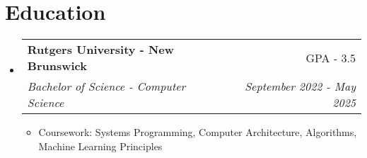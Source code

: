 \documentclass[letterpaper,10pt]{article}
\makeatletter
\newcommand{\resumeItem}[1]{
  \item\small{
    {#1 \vspace{-2pt}}
  }
}
\newcommand{\resumeSubheading}[4]{
  \vspace{-2pt}\item
    \begin{tabular*}{0.97\textwidth}[t]{l@{\extracolsep{\fill}}r}
      \textbf{#1} & #2 \\
      \textit{\small#3} & \textit{\small #4} \\
    \end{tabular*}\vspace{-7pt}
}
\newcommand{\resumeSubHeadingListStart}{\begin{itemize}[leftmargin=0.15in, label={}]}
\newcommand{\resumeSubHeadingListEnd}{\end{itemize}}
\newcommand{\resumeItemListStart}{\begin{itemize}}
\newcommand{\resumeItemListEnd}{\end{itemize}\vspace{-5pt}}
\makeatother
\begin{document}
\section{Education}
  \resumeSubHeadingListStart
    \resumeSubheading
      {Rutgers University - New Brunswick}{GPA - 3.5}
      {Bachelor of Science - Computer Science}{September 2022 - May 2025}
      \resumeItemListStart
        \resumeItem{Coursework: Systems Programming, Computer Architecture, Algorithms, Machine Learning Principles}
    \resumeItemListEnd
  \resumeSubHeadingListEnd
\end{document}

